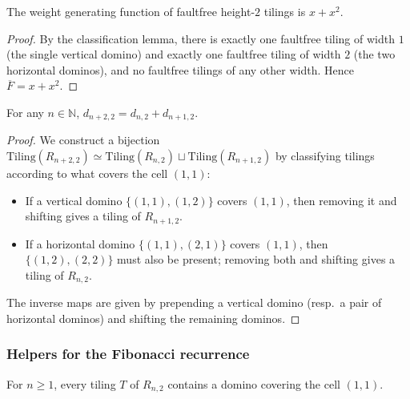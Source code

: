 \begin{lemma}
\label{lem.gf-ws.weightGenFun-faultfreeHeight2}
\leanhelper
\leanok
The weight generating function of faultfree height-$2$ tilings is $x + x^2$.
\end{lemma}

\begin{proof}
\leanok
By the classification lemma, there is exactly one faultfree tiling of width $1$
(the single vertical domino) and exactly one faultfree tiling of width $2$
(the two horizontal dominos), and no faultfree tilings of any other width.
Hence $\overline{F} = x + x^2$.
\end{proof}

\begin{lemma}
\label{lem.gf-ws.numTilings-recurrence}
\leanhelper
\leanok
For any $n \in \mathbb{N}$, $d_{n+2,2} = d_{n,2} + d_{n+1,2}$.
\end{lemma}

\begin{proof}
\leanok
We construct a bijection
$\mathrm{Tiling}(R_{n+2,2}) \simeq \mathrm{Tiling}(R_{n,2}) \sqcup \mathrm{Tiling}(R_{n+1,2})$
by classifying tilings according to what covers the cell $(1,1)$:
\begin{itemize}
\item If a vertical domino $\{(1,1),(1,2)\}$ covers $(1,1)$, then removing it and
shifting gives a tiling of $R_{n+1,2}$.
\item If a horizontal domino $\{(1,1),(2,1)\}$ covers $(1,1)$, then $\{(1,2),(2,2)\}$
must also be present; removing both and shifting gives a tiling of $R_{n,2}$.
\end{itemize}
The inverse maps are given by prepending a vertical domino (resp.\ a pair of
horizontal dominos) and shifting the remaining dominos.
\end{proof}

\subsubsection{Helpers for the Fibonacci recurrence}

\begin{lemma}
\label{lem.gf-ws.exists-domino-covering-11}
For $n \ge 1$, every tiling $T$ of $R_{n,2}$ contains a domino covering
the cell $(1,1)$.
\end{lemma}

